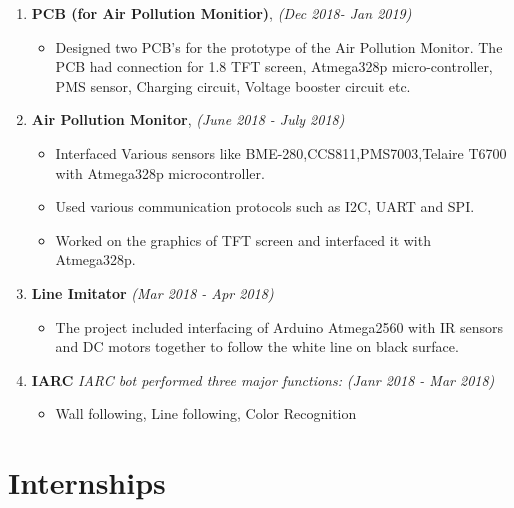 \documentclass[10pt,a4paper,sans]{moderncv} %
\begin{document}
\begin{enumerate}
\item \textbf{PCB (for Air Pollution Monitior)},  \textit{ (Dec 2018- Jan 2019) }
\begin{itemize}
\item Designed two PCB's for the prototype of the Air Pollution Monitor. The PCB had connection for 1.8 TFT screen, Atmega328p micro-controller, PMS sensor, Charging circuit, Voltage
booster circuit etc.
\newline
\end{itemize}

\item \textbf{Air Pollution Monitor},     \textit{ (June 2018 - July 2018) }
\begin{itemize}
\item Interfaced Various sensors like BME-280,CCS811,PMS7003,Telaire T6700 with Atmega328p microcontroller.
\item Used various communication protocols such as I2C, UART and SPI.
\item Worked on the graphics of TFT screen and interfaced it with  Atmega328p.
\newline
\end{itemize}

\item \textbf{Line Imitator}   \textit{ (Mar 2018 - Apr 2018) }
\begin{itemize}
\item The project included interfacing of Arduino Atmega2560 with IR sensors and DC motors together to follow the white line on black surface.
\newline
\end{itemize}

\item \textbf{IARC} \textit{IARC bot performed three major functions:}  \textit{ (Janr 2018 - Mar 2018) }
\begin{itemize}
\item Wall following, Line following, Color Recognition 
\end{itemize}



\end{enumerate}




\section{ Internships}
\end{document}
